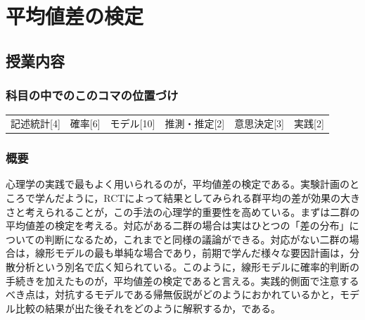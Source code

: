 \section{平均値差の検定}
\label{lesson19}

\subsection{授業内容}
\subsubsection{科目の中でのこのコマの位置づけ}
\begin{tabular}[t]{cccccc}
    記述統計[4] & 確率[6] & モデル[10] & 推測・推定[2] & 意思決定[3] & 実践[2]
\end{tabular}

\subsubsection{概要}
心理学の実践で最もよく用いられるのが，平均値差の検定である。実験計画のところで学んだように，RCTによって結果としてみられる群平均の差が効果の大きさと考えられることが，この手法の心理学的重要性を高めている。まずは二群の平均値差の検定を考える。対応がある二群の場合は実はひとつの「差の分布」についての判断になるため，これまでと同様の議論ができる。対応がない二群の場合は，線形モデルの最も単純な場合であり，前期で学んだ様々な要因計画は，分散分析という別名で広く知られている。このように，線形モデルに確率的判断の手続きを加えたものが，平均値差の検定であると言える。実践的側面で注意するべき点は，対抗するモデルである帰無仮説がどのようにおかれているかと，モデル比較の結果が出た後それをどのように解釈するか，である。
